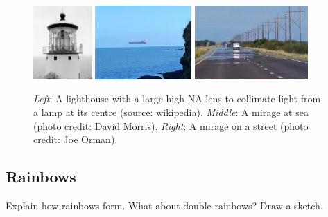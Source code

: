 \documentclass[a4paper]{report}
\begin{document}
	\begin{figure}[h]
		\center
		\includegraphics[width=0.2\textwidth]{figures/lighthouse.png}
		\includegraphics[width=0.327\textwidth]{figures/superior_mirage.png}
		\includegraphics[width=0.385\textwidth]{figures/mirage.png}
		\captionsetup{width=0.93\textwidth}
		\caption{\emph{Left}: A lighthouse with a large high NA lens to collimate light from a lamp at its centre (source: wikipedia). 
		\emph{Middle}: A mirage at sea (photo credit: David Morris).
		\emph{Right}: A mirage on a street (photo credit: Joe Orman).}
		\label{fig:lighthouse_mirage}
	\end{figure}
	
	
    \subsection{Rainbows}
    Explain how rainbows form. What about double rainbows? Draw a sketch.
	
\end{document}
